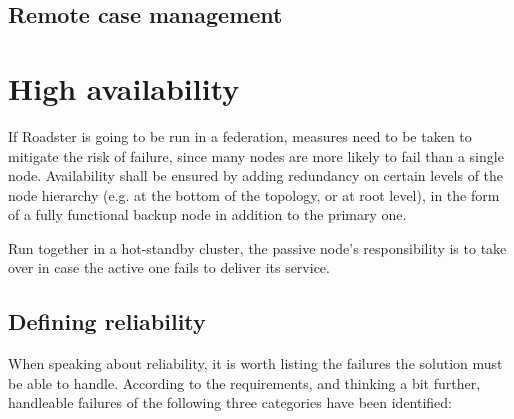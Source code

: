 \subsection{Remote case management}


\section{High availability}\label{sec:approach:ha}
If Roadster is going to be run in a federation, measures need to be taken to
mitigate the risk of failure, since many nodes are more likely to fail than a
single node. Availability shall be ensured by
adding redundancy on certain levels of the node hierarchy (e.g. at the bottom
of the topology, or at root level), in the form of a
fully functional backup node in addition to the primary one.

Run together in a hot-standby cluster, the passive node's responsibility is to
take over in case the active one fails to deliver its service.



\subsection{Defining reliability}
When speaking about reliability, it is worth listing the failures the solution must be
able to handle. According to the requirements, and thinking a bit further,
handleable failures of the following three categories have been identified:

